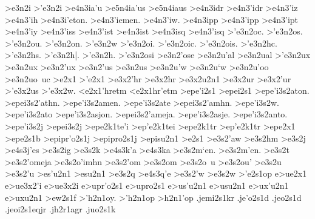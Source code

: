 {	>e3n2i
	>'e3n2i
		>e4n3ia'u  		%
			>e5n4ia'us  		%
			>e5n4iaus 
		>e4n3idr    		%
		>e4n3'idr		%
		>e4n3'iz   		%
		>e4n3'ih   		%
		>e4n3i'eton.
		>e4n3'iemen.
		>e4n3'iw.
		>e4n3ipp   		%
		>e4n3'ipp  		%
		>e4n3'ipt  		%
		>e4n3'iy
		>e4n3'iss  		%
		>e4n3'ist  		%
		>e4n3ist
		>e4n3isq   		%
		>e4n3'isq  		%
	>'e3n2oc.		%
	>'e3n2os.
	>'e3n2ou.
	>'e3n2on.
	>'e3n2w
	>'e3n2oi.
	>'e3n2oic.
	>'e3n2ois.
	>'e3n2hc.
	>'e3n2hs.
	>'e3n2h|.
 	>'e3n2h.
	>'e3n2osi		%
	>e3n2'ose
	>e3n2u'al  		%
	>e3n2ual
	>'e3n2ux    		%
	>e3n2ux 		%
	>e3n2'ux		%
	>e3n2'us    		%
	>e3n2us
	>e3n2u'w    		%
	>e3n2u`w
	>e3n2u'oo
	>e3n2uo~uc
>e2x1
>'e2x1
	>e3x2'hr   		%
	>e3x2hr 		%
	>e3x2u2n1   		%
	>e3x2ur     		%
	>e3x2'ur  		%
	>'e3x2us  		%
	>'e3x2w.
<e2x1'hretm		%
<e2x1hr'etm
>epe'i2s1 		%
>epei2s1
	>epe'i3s2aton.	%
	>epei3s2'athn.
	>epe'i3s2amen.
	>epe'i3s2ate
	>epei3s2'amhn.
	>epe'i3s2w.
	>epe'i3s2ato
	>epe'i3s2asjon.
	>epei3s2'ameja.
	>epe'i3s2asje.
	>epe'i3s2anto.
	>epe'i3s2j	%
	>epei3s2j
>epe2k1te'i 		%
>ep'e2k1tei
>epe2k1tr 		%
>ep'e2k1tr
>epe2x1
>epe2s1b 		%
>epipr'o2s1j		%
>epipro2s1j
>episu2n1  		%
>e2s1
	>e3s2'aw 		%
	>e3s2hm  		%
	>e3s2j 			%
		>e4s3j'es 		%
	>e3s2ig 		%
	>e3s2k
		>e4s3k'a 		%
		>e4s3ka  		%
%
	>e3s2m`en.  >e3s2m'en.	%
	>e3s2t
	>e3s2'omeja
	>e3s2o'imhn
	>e3s2'om		%
	>e3s2om
	>e3s2o~u 		%
	>e3s2ou'
%
	>e3s2u  		%
	>e3s2'u
	>es'u2n1 		%
	>esu2n1
	>e3s2q
		>e4s3q'e		%
	>e3s2'w
	>e3s2w
>'e2s1op 		%
e>ue2x1  		%
	e>ue3x2'i 		%
	e>ue3x2i
e>upr'o2s1 		%
e>upro2s1
e>us'u2n1 		%
e>usu2n1
e>ux'u2n1 		%
e>uxu2n1
>ew2s1f   		%
>'h2n1oy.		%
>'h2n1op
>h2n1'op
.jemi2s1kr  %
.je'o2s1d   %
.jeo2s1d
.jeoi2s1eqjr		%
.jh2r1agr  		%
.juo2s1k     		%
}
